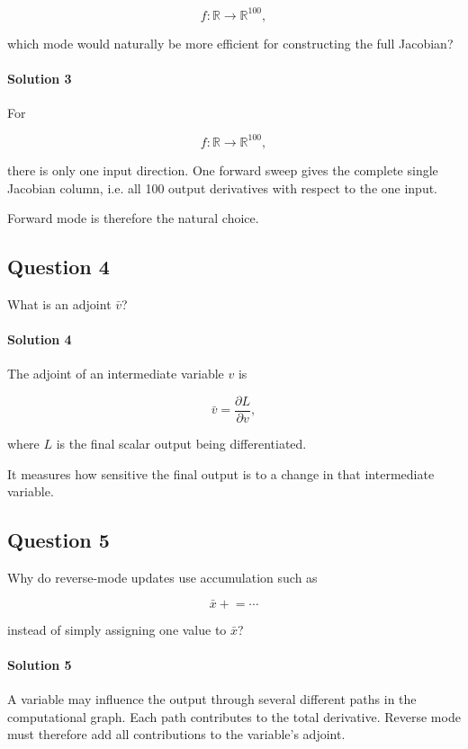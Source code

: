 \documentclass[10pt]{article}
\begin{document}
\[
f:\mathbb R\to\mathbb R^{100},
\]

which mode would naturally be more efficient for constructing the full Jacobian?

\begingroup\color{red}
\paragraph*{Solution 3}
For

\[
f:\mathbb R\to\mathbb R^{100},
\]

there is only one input direction. One forward sweep gives the complete single Jacobian column, i.e. all 100 output derivatives with respect to the one input.

Forward mode is therefore the natural choice.
\par\endgroup

\subsection*{Question 4}
What is an adjoint $\bar v$?

\begingroup\color{red}
\paragraph*{Solution 4}
The adjoint of an intermediate variable $v$ is

\[
\bar v=\frac{\partial L}{\partial v},
\]

where $L$ is the final scalar output being differentiated.

It measures how sensitive the final output is to a change in that intermediate variable.
\par\endgroup

\subsection*{Question 5}
Why do reverse-mode updates use accumulation such as

\[
\bar x\mathrel{+}=\cdots
\]

instead of simply assigning one value to $\bar x$?

\begingroup\color{red}
\paragraph*{Solution 5}
A variable may influence the output through several different paths in the computational graph. Each path contributes to the total derivative. Reverse mode must therefore add all contributions to the variable's adjoint.
\par\endgroup
\end{document}
